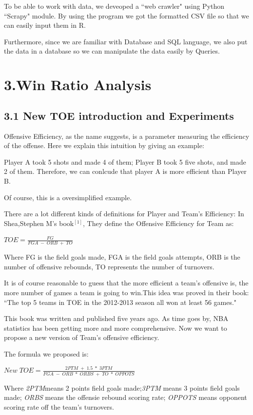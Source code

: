 \documentclass[11pt]{article}
\begin{document}
To be able to work with data, we deveoped a ``web crawler" using Python ``Scrapy" module. By using the program we got the formatted CSV file so that we can easily input them in R.

Furthermore, since we are familiar with Database and SQL language, we also put the data in a database so we can manipulate the data easily by Queries.
\section*{3.Win Ratio Analysis}
\subsection*{3.1 New TOE introduction and Experiments}
\hspace{1.5em}Offensive Efficiency, as the name suggests, is a parameter measuring the efficiency of the offense. Here we explain this intuition by giving an example:

Player A took 5 shots and made 4 of them; Player B took 5 five shots, and made 2 of them. Therefore, we can conlcude that player A is more efficient than Player B.

Of course, this is a oversimplified example.

There are a lot different kinds of definitions for Player and Team's Efficiency:
In Shea,Stephen M's book$^{[1]}$, They define the Offensive Efficiency for Team as:
\begin{center}
$TOE = \frac{FG}{FGA \;-\; ORB\; + \;TO}$
\end{center}

Where FG is the field goals made, FGA is the field goals attempts, ORB is the number of offensive rebounds, TO represents the number of turnovers. 

It is of course reasonable to guess that the more efficient a team's offensive is, the more number of games a team is going to win.This idea was proved in their book: ``The top 5 teams in TOE in the 2012-2013 season all won at least 56 games."

This book was written and published five years ago. As time goes by, NBA statistics has been getting more and more comprehensive.
Now we want to propose a new version of Team's offensive efficiency.

The formula we proposed is:
\begin{center}
$New\;TOE = \frac{2PTM \;+ \;1.5 \;* \;3PTM}{FGA \;-\; ORB \;*\; ORBS \; + \;TO\; * \;OPPOTS}$
\end{center}
Where \textit{2PTM}means 2 points field goals made;\textit{3PTM} means 3 points field goals made; \textit{ORBS} means the offensie rebound scoring rate; \textit{OPPOTS} means opponent scoring rate off the team's turnovers.
\end{document}
